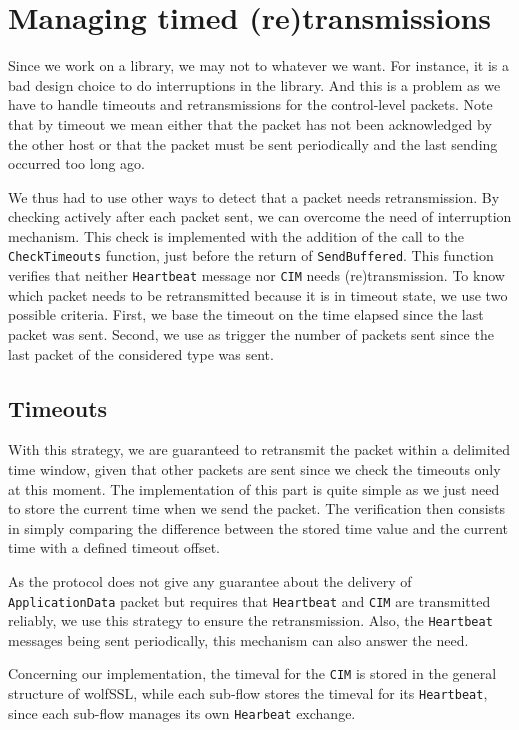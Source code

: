 \section{Managing timed (re)transmissions}

Since we work on a library, we may not to whatever we want. For instance, it is a bad design choice to do interruptions in the library. And this is a problem as we have to handle timeouts and retransmissions for the control-level packets. Note that by timeout we mean either that the packet has not been acknowledged by the other host or that the packet must be sent periodically and the last sending occurred too long ago.

We thus had to use other ways to detect that a packet needs retransmission. By checking actively after each packet sent, we can overcome the need of interruption mechanism. This check is implemented with the addition of the call to the \texttt{CheckTimeouts} function, just before the return of \texttt{SendBuffered}. This function verifies that neither \texttt{Heartbeat} message nor \texttt{CIM} needs (re)transmission. To know which packet needs to be retransmitted because it is in timeout state, we use two possible criteria. First, we base the timeout on the time elapsed since the last packet was sent. Second, we use as trigger the number of packets sent since the last packet of the considered type was sent.

\subsection{Timeouts}

With this strategy, we are guaranteed to retransmit the packet within a delimited time window, given that other packets are sent since we check the timeouts only at this moment. The implementation of this part is quite simple as we just need to store the current time when we send the packet. The verification then consists in simply comparing the difference between the stored time value and the current time with a defined timeout offset.

As the protocol does not give any guarantee about the delivery of \texttt{ApplicationData} packet but requires that \texttt{Heartbeat} and \texttt{CIM} are transmitted reliably, we use this strategy to ensure the retransmission. Also, the \texttt{Heartbeat} messages being sent periodically, this mechanism can also answer the need.

Concerning our implementation, the timeval for the \texttt{CIM} is stored in the general structure of wolfSSL, while each sub-flow stores the timeval for its \texttt{Heartbeat}, since each sub-flow manages its own \texttt{Hearbeat} exchange.


